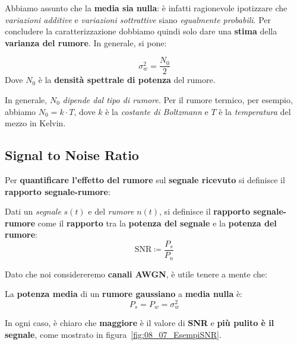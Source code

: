Abbiamo assunto che la \textbf{media sia nulla}: è infatti ragionevole 
ipotizzare che \textit{variazioni additive} e \textit{variazioni sottrattive} 
siano \textit{egualmente probabili}.
Per concludere la caratterizzazione dobbiamo quindi solo dare una \textbf{stima} della
\textbf{varianza del rumore}. In generale, si pone:

\begin{definition}
    \[
        \sigma^2_{w} = \frac{N_{0}}{2}
    \] 
    Dove $N_{0}$ è la \textbf{densità spettrale di potenza} del rumore.
\end{definition}

In generale, $N_{0}$ \textit{dipende dal tipo di rumore}. Per il rumore termico, per
esempio, abbiamo $N_{0} = k\cdot T$, dove $k$ è la \textit{costante di Boltzmann} e 
$T$ è la \textit{temperatura} del mezzo in Kelvin.

\subsection{Signal to Noise Ratio}

Per \textbf{quantificare l'effetto del rumore} sul \textbf{segnale ricevuto}
si definisce il \textbf{rapporto segnale-rumore}:

\begin{definition}
    Dati un \textit{segnale} $s(t)$ e del \textit{rumore} $n(t)$, si
    definisce il \textbf{rapporto segnale-rumore} come il \textbf{rapporto} tra
    la \textbf{potenza del segnale} e la \textbf{potenza del rumore}:
    \[
        \text{SNR} \coloneqq \frac{P_s}{P_n}
    \] 
\end{definition}

Dato che noi considereremo \textbf{canali AWGN}, è utile tenere a mente che:

\begin{prop}
    La \textbf{potenza media} di un \textbf{rumore gaussiano} a
    \textbf{media nulla} è:
    \[
        P_s = P_{w} = \sigma^2_{w}
    \] 
\end{prop}

In ogni caso, è chiaro che \textbf{maggiore} è il valore di \textbf{SNR} e
\textbf{più pulito è il segnale}, come mostrato in figura~\ref{fig:08_07_EsempiSNR}.

